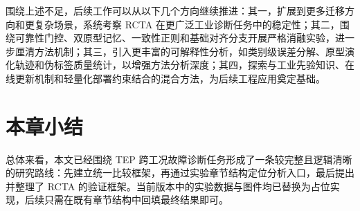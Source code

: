 围绕上述不足，后续工作可以从以下几个方向继续推进：其一，扩展到更多迁移方向和更复杂场景，系统考察 RCTA 在更广泛工业诊断任务中的稳定性；其二，围绕可靠性门控、双原型记忆、一致性正则和基础对齐分支开展严格消融实验，进一步厘清方法机制；其三，引入更丰富的可解释性分析，如类别级误差分解、原型演化轨迹和伪标签质量统计，以增强方法分析深度；其四，探索与工业先验知识、在线更新机制和轻量化部署约束结合的混合方法，为后续工程应用奠定基础。

\section{本章小结}
总体来看，本文已经围绕 TEP 跨工况故障诊断任务形成了一条较完整且逻辑清晰的研究路线：先建立统一比较框架，再通过实验章节结构定位分析入口，最后提出并整理了 RCTA 的验证框架。当前版本中的实验数据与图件均已替换为占位实现，后续只需在既有章节结构中回填最终结果即可。
